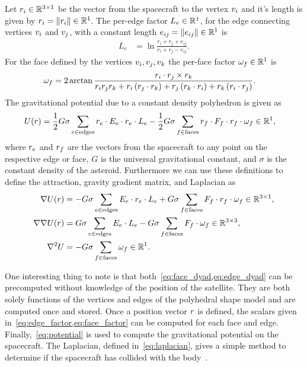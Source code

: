 \documentclass[letterpaper, paper,11pt]{AAS}		%
\begin{document}
Let \( r_i \in \mathbb{R}^{3 \times 1} \) be the vector from the spacecraft to the vertex \( v_i \) and it's length is given by \( r_i = \left\| r_i \right\| \in \mathbb{R}^{1} \).
The per-edge factor \( L_e \in \mathbb{R}^{1}\), for the edge connecting vertices \( v_i \) and \( v_j \), with a constant length \( e_{ij} = \left\| e_{ij} \right\| \in \mathbb{R}^1\) is
\begin{align}\label{eq:edge_factor}
    L_e &= \ln \frac{r_i + r_j + e_{ij}}{r_i + r_j - e_{ij}}.
\end{align}
For the face defined by the vertices \( v_i, v_j, v_k \) the per-face factor \( \omega_f \in \mathbb{R}^{1} \) is
\begin{align}\label{eq:face_factor}
    \omega_f &= 2 \arctan \frac{r_i \cdot r_j \times r_k}{r_i r_j r_k + r_i \left( r_j \cdot r_k \right) + r_j \left( r_k \cdot r_i \right) + r_k \left( r_i \cdot r_j \right)} .
\end{align}
The gravitational potential due to a constant density polyhedron is given as
\begin{align}\label{eq:potential}
    U(r) &= \frac{1}{2} G \sigma \sum_{e \in \text{edges}} r_e \cdot E_e \cdot r_e \cdot L_e - \frac{1}{2}G \sigma \sum_{f \in \text{faces}} r_f \cdot F_f \cdot r_f \cdot \omega_f \in \mathbb{R}^1,
\end{align}
where \( r_e\) and \(r_f \) are the vectors from the spacecraft to any point on the respective edge or face, \( G\) is the universal gravitational constant, and \( \sigma \) is the constant density of the asteroid.
Furthermore we can use these definitions to define the attraction, gravity gradient matrix, and Laplacian as
\begin{align}
    \nabla U ( r ) &= -G \sigma \sum_{e \in \text{edges}} E_e \cdot r_e \cdot L_e + G \sigma \sum_{f \in \text{faces}} F_f \cdot r_f \cdot \omega_f \in \mathbb{R}^{3 \times 1} , \label{eq:attraction}\\
    \nabla \nabla U ( r ) &= G \sigma \sum_{e \in \text{edges}} E_e  \cdot L_e - G \sigma \sum_{f \in \text{faces}} F_f \cdot \omega_f \in \mathbb{R}^{3 \times 3}, \label{eq:gradient_matrix}\\
    \nabla^2 U &= -G \sigma \sum_{f \in \text{faces}}  \omega_f \in \mathbb{R}^1 .\label{eq:laplacian}
\end{align}

One interesting thing to note is that both~\cref{eq:face_dyad,eq:edge_dyad} can be precomputed without knowledge of the position of the satellite.
They are both solely functions of the vertices and edges of the polyhedral shape model and are computed once and stored.
Once a position vector \( r \) is defined, the scalars given in~\cref{eq:edge_factor,eq:face_factor} can be computed for each face and edge.
Finally,~\cref{eq:potential} is used to compute the gravitational potential on the spacecraft.
The Laplacian, defined in~\cref{eq:laplacian}, gives a simple method to determine if the spacecraft has collided with the body~\cite{werner1996}. 
\end{document}
